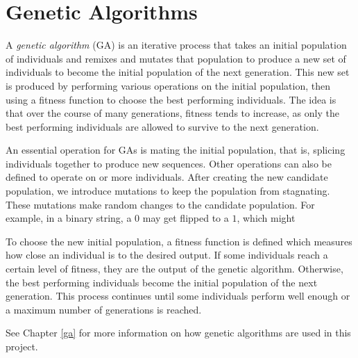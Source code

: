 \section{Genetic Algorithms} \label{bg:ga}

A \textit{genetic algorithm} (GA) is an iterative process that takes an initial population of individuals and remixes and mutates that population to produce a new set of individuals to become the initial population of the next generation.
This new set is produced by performing various operations on the initial population, then using a fitness function to choose the best performing individuals.
The idea is that over the course of many generations, fitness tends to increase, as only the best performing individuals are allowed to survive to the next generation.

An essential operation for GAs is mating the initial population, that is, splicing individuals together to produce new sequences.
Other operations can also be defined to operate on or more individuals.
After creating the new candidate population, we introduce mutations to keep the population from stagnating.
These mutations make random changes to the candidate population.
For example, in a binary string, a $0$ may get flipped to a $1$, which might 

To choose the new initial population, a fitness function is defined which measures how close an individual is to the desired output.
If some individuals reach a certain level of fitness, they are the output of the genetic algorithm.
Otherwise, the best performing individuals become the initial population of the next generation.
This process continues until some individuals perform well enough or a maximum number of generations is reached.

See Chapter \ref{ga} for more information on how genetic algorithms are used in this project.

